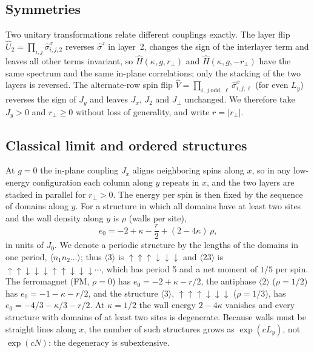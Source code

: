 \documentclass[
 aps,prb,
 twocolumn,
 superscriptaddress,
 longbibliography,
 nofootinbib,
 floatfix
]{revtex4-2}
\newcommand{\Jp}{J_\perp}
\newcommand{\rp}{r_\perp}
\newcommand{\up}{\uparrow}
\newcommand{\dn}{\downarrow}
\begin{document}
\subsection{Symmetries}
\label{sec:symmetries}

Two unitary transformations relate different couplings exactly. The layer flip
$\hat U_2=\prod_{i,j}\hat\sigma^x_{i,j,2}$ reverses $\hat\sigma^z$ in layer~2, changes the sign of
the interlayer term and leaves all other terms invariant, so $\hat H(\kappa,g,\rp)$ and
$\hat H(\kappa,g,-\rp)$ have the same spectrum and the same in-plane correlations; only the
stacking of the two layers is reversed. The alternate-row spin flip
$\hat V=\prod_{i,\,j\ \mathrm{odd},\,\ell}\hat\sigma^x_{i,j,\ell}$ (for even $L_y$) reverses the sign
of $J_y$ and leaves $J_x$, $J_2$ and $\Jp$ unchanged. We therefore take $J_y>0$ and $\rp\ge0$ without
loss of generality, and write $r=|\rp|$.

\subsection{Classical limit and ordered structures}
\label{sec:classical}

At $g=0$ the in-plane coupling $J_x$ aligns neighboring spins along $x$, so in any low-energy
configuration each column along $y$ repeats in $x$, and the two layers are stacked in parallel for
$\rp>0$. The energy per spin is then fixed by the sequence of domains along $y$. For a structure in
which all domains have at least two sites and the wall density along $y$ is $\rho$ (walls per site),
\begin{equation}
e_0=-2+\kappa-\frac{r}{2}+(2-4\kappa)\,\rho ,
\label{eq:e0}
\end{equation}
in units of $J_0$. We denote a periodic structure by the lengths of the domains in one period,
$\langle n_1n_2\dots\rangle$; thus $\langle3\rangle$ is $\up\up\up\dn\dn\dn$ and $\langle23\rangle$ is
$\up\up\dn\dn\dn\up\up\dn\dn\dn\cdots$, which has period 5 and a net moment of $1/5$ per spin. The ferromagnet
(FM, $\rho=0$) has $e_0=-2+\kappa-r/2$, the antiphase
$\langle2\rangle$ ($\rho=1/2$) has $e_0=-1-\kappa-r/2$, and the structure $\langle3\rangle$,
$\up\up\up\dn\dn\dn$ ($\rho=1/3$), has $e_0=-4/3-\kappa/3-r/2$. At $\kappa=1/2$ the wall energy
$2-4\kappa$ vanishes and every structure with domains of at least two sites is degenerate. Because
walls must be straight lines along $x$, the number of such structures grows as $\exp(cL_y)$, not
$\exp(cN)$: the degeneracy is subextensive.
\end{document}
